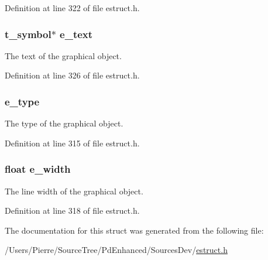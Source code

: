 Definition at line 322 of file estruct.\-h.

\hypertarget{struct__egobj_a5f97b246c0da885ff0cd44b32a967338}{
\subsubsection[{e\-\_\-text}]{\setlength{\rightskip}{0pt plus 5cm}t\-\_\-symbol$\ast$ e\-\_\-text}}\label{struct__egobj_a5f97b246c0da885ff0cd44b32a967338}
The text of the graphical object. 

Definition at line 326 of file estruct.\-h.

\hypertarget{struct__egobj_a8083c24bd4930af629d483d7bf45a20a}{
\subsubsection[{e\-\_\-type}]{ e\-\_\-type}}\label{struct__egobj_a8083c24bd4930af629d483d7bf45a20a}
The type of the graphical object. 

Definition at line 315 of file estruct.\-h.

\hypertarget{struct__egobj_abe0dac7e3167ea1dd6c4e238ab4ab8bd}{
\subsubsection[{e\-\_\-width}]{\setlength{\rightskip}{0pt plus 5cm}float e\-\_\-width}}\label{struct__egobj_abe0dac7e3167ea1dd6c4e238ab4ab8bd}
The line width of the graphical object. 

Definition at line 318 of file estruct.\-h.



The documentation for this struct was generated from the following file\-:\begin{DoxyCompactItemize}
\item 
/\-Users/\-Pierre/\-Source\-Tree/\-Pd\-Enhanced/\-Sources\-Dev/\hyperlink{estruct_8h}{estruct.\-h}\end{DoxyCompactItemize}
